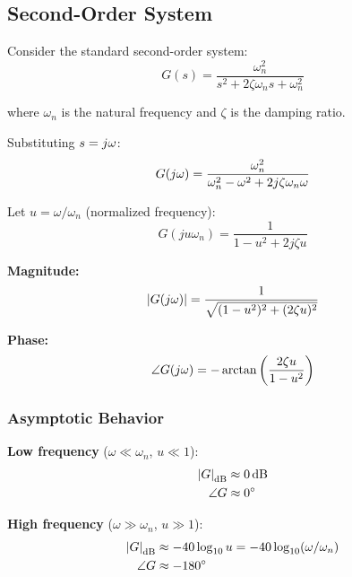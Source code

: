 \subsection{Second-Order System}

Consider the standard second-order system:
\begin{equation}
G(s) = \frac{\omega_n^2}{s^2 + 2\zeta\omega_n s + \omega_n^2}
\label{eq:second_order}
\end{equation}

where $\omega_n$ is the natural frequency and $\zeta$ is the damping ratio.

Substituting $s = j\omega$:
\begin{equation}
G(j\omega) = \frac{\omega_n^2}{\omega_n^2 - \omega^2 + 2j\zeta\omega_n\omega}
\label{eq:second_order_jw}
\end{equation}

Let $u = \omega/\omega_n$ (normalized frequency):
\begin{equation}
G(ju\omega_n) = \frac{1}{1 - u^2 + 2j\zeta u}
\label{eq:second_order_normalized}
\end{equation}

\textbf{Magnitude:}
\begin{equation}
\left|G(j\omega)\right| = \frac{1}{\sqrt{(1-u^2)^2 + (2\zeta u)^2}}
\label{eq:second_order_mag}
\end{equation}

\textbf{Phase:}
\begin{equation}
\angle G(j\omega) = -\arctan\left(\frac{2\zeta u}{1 - u^2}\right)
\label{eq:second_order_phase}
\end{equation}

\subsubsection{Asymptotic Behavior}

\textbf{Low frequency} ($\omega \ll \omega_n$, $u \ll 1$):
\begin{align}
\left|G\right|_{\text{dB}} &\approx 0\,\text{dB} \\
\angle G &\approx 0^\circ
\end{align}

\textbf{High frequency} ($\omega \gg \omega_n$, $u \gg 1$):
\begin{align}
\left|G\right|_{\text{dB}} &\approx -40\log_{10}u = -40\log_{10}(\omega/\omega_n) \\
\angle G &\approx -180^\circ
\end{align}


